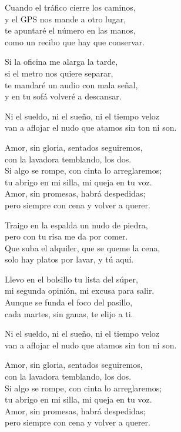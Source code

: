 \begin{lyrics}

Cuando el tráfico cierre los caminos,\\
y el GPS nos mande a otro lugar,\\
te apuntaré el número en las manos,\\
como un recibo que hay que conservar.

Si la oficina me alarga la tarde,\\
si el metro nos quiere separar,\\
te mandaré un audio con mala señal,\\
y en tu sofá volveré a descansar.

Ni el sueldo, ni el sueño, ni el tiempo veloz\\
van a aflojar el nudo que atamos sin ton ni son.

Amor, sin gloria, sentados seguiremos,\\
con la lavadora temblando, los dos.\\
Si algo se rompe, con cinta lo arreglaremos;\\
tu abrigo en mi silla, mi queja en tu voz.\\
Amor, sin promesas, habrá despedidas;\\
pero siempre con cena y volver a querer.

Traigo en la espalda un nudo de piedra,\\
pero con tu risa me da por comer.\\
Que suba el alquiler, que se queme la cena,\\
solo hay platos por lavar, y tú aquí.

Llevo en el bolsillo tu lista del súper,\\
mi segunda opinión, mi excusa para salir.\\
Aunque se funda el foco del pasillo,\\
cada martes, sin ganas, te elijo a ti.

Ni el sueldo, ni el sueño, ni el tiempo veloz\\
van a aflojar el nudo que atamos sin ton ni son.

Amor, sin gloria, sentados seguiremos,\\
con la lavadora temblando, los dos.\\
Si algo se rompe, con cinta lo arreglaremos;\\
tu abrigo en mi silla, mi queja en tu voz.\\
Amor, sin promesas, habrá despedidas;\\
pero siempre con cena y volver a querer.


\end{lyrics}
